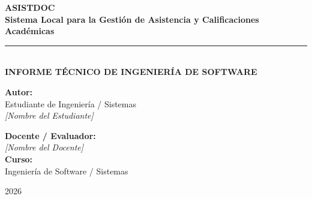 \documentclass[12pt,a4paper]{article}
\begin{document}
\begin{titlepage}
    \centering
    \vspace*{1cm}

    {\Huge \bfseries \color{primarycolor} ASISTDOC} \\[0.5cm]
    {\Large \bfseries Sistema Local para la Gestión de Asistencia y Calificaciones Académicas} \\[1.5cm]

    \rule{\linewidth}{0.5mm} \\[1cm]

    {\large \bfseries INFORME TÉCNICO DE INGENIERÍA DE SOFTWARE} \\[2cm]

    \begin{minipage}{0.48\textwidth}
        \begin{flushleft} \large
            \textbf{Autor:} \\[0.2cm]
            Estudiante de Ingeniería / Sistemas \\[0.1cm]
            \textit{[Nombre del Estudiante]}
        \end{flushleft}
    \end{minipage}
    \begin{minipage}{0.48\textwidth}
        \begin{flushright} \large
            \textbf{Docente / Evaluador:} \\[0.2cm]
            \textit{[Nombre del Docente]} \\[0.1cm]
            \textbf{Curso:} \\[0.2cm]
            Ingeniería de Software / Sistemas
        \end{flushright}
    \end{minipage}

    \vfill

    {\large 2026}
\end{titlepage}

\tableofcontents
\newpage

\end{document}
